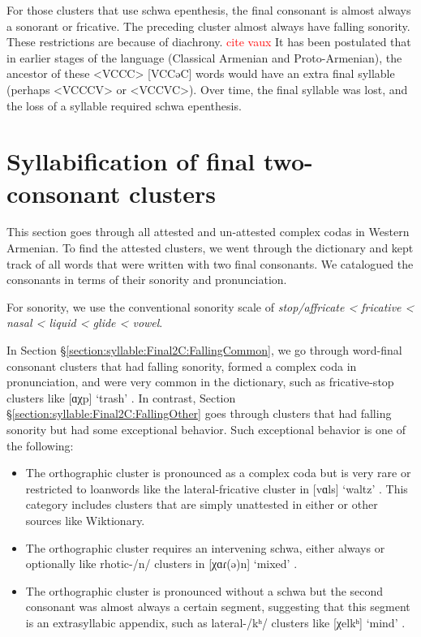 	
	For those clusters that use schwa epenthesis, the final consonant is almost always a sonorant or fricative. The preceding cluster almost always have falling sonority.  These restrictions are because of diachrony. \textcolor{red}{cite vaux}  It has been postulated that in earlier stages of the language (Classical Armenian and Proto-Armenian), the ancestor of these <VCCC> [VCCəC] words would have an extra final syllable (perhaps <VCCCV> or <VCCVC>). Over time, the final syllable was lost, and the loss of a syllable required schwa epenthesis. 
	
	
	\section{Syllabification of final two-consonant clusters}\label{section:syllable:Final2C}
	This section goes through all attested and un-attested complex codas in Western Armenian. To find the attested clusters, we went through the \citeauthor{kouyoumdjian-1970-DictionaryArmenianEnglish} dictionary and kept track of all words that were written with two final consonants. We catalogued the consonants in terms of their sonority and pronunciation. 
	
	For sonority, we use the conventional sonority scale of  \textit{stop/affricate < fricative < nasal < liquid < glide < vowel}. 
	
	In Section \S\ref{section:syllable:Final2C:FallingCommon}, we go through  word-final consonant clusters that had falling sonority,  formed a complex coda in pronunciation,  and were very common in the dictionary, such as fricative-stop clusters like [ɑχp] `trash' .  In contrast, Section \S\ref{section:syllable:Final2C:FallingOther} goes through  clusters that had falling sonority but had some exceptional behavior. Such exceptional behavior is one of the following:
	\begin{itemize}[noitemsep,topsep=0pt]
		\item The orthographic cluster is   pronounced as a complex coda but is  very rare or restricted to loanwords like the lateral-fricative cluster in [vɑls]   `waltz'  . This category includes clusters that are simply unattested in either \citeauthor{kouyoumdjian-1970-DictionaryArmenianEnglish}
		or other sources like Wiktionary. 
		
		\item The orthographic cluster requires an intervening schwa, either always    or optionally like rhotic-/n/ clusters in [χɑɾ(ə)n] `mixed' . 
		\item The orthographic cluster is pronounced without a schwa but the second consonant was almost always a certain segment, suggesting that this segment is an extrasyllabic appendix, such as lateral-/kʰ/ clusters like [χelkʰ] `mind' .
	\end{itemize}
	
